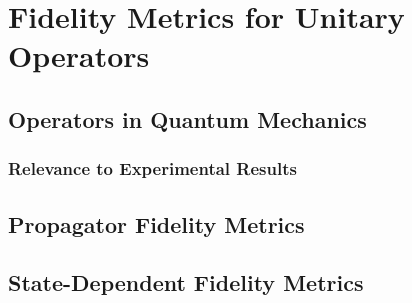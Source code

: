 \chapter{Fidelity Metrics for Unitary Operators}


\section{Operators in Quantum Mechanics}



\subsection{Relevance to Experimental Results}



\section{Propagator Fidelity Metrics}



\section{State-Dependent Fidelity Metrics}
